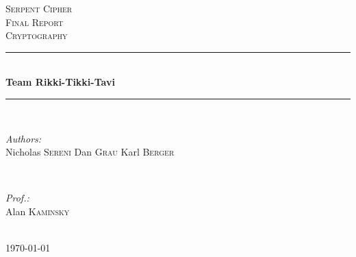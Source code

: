 \documentclass[12pt]{article} %
\begin{document}

\begin{titlepage}

\newcommand{\HRule}{\rule{\linewidth}{0.5mm}} %

\center %

\textsc{\LARGE Serpent Cipher}\\[1.5cm] %
\textsc{\Large Final Report}\\[0.5cm] %
\textsc{\large Cryptography}\\[0.5cm] %

\HRule \\[0.4cm]
{ \huge \bfseries Team Rikki-Tikki-Tavi}\\[0.4cm] %
\HRule \\[1.5cm]

\begin{minipage}{0.4\textwidth}
\begin{flushleft} \large
\emph{Authors:}\\
Nicholas \textsc{Sereni} %
\newline
Dan \textsc{Grau}
\newline
Karl \textsc{Berger}
\end{flushleft}
\end{minipage}
~
\begin{minipage}{0.4\textwidth}
\begin{flushright} \large
\emph{Prof.:} \\
Alan \textsc{Kaminsky} %
\end{flushright}
\end{minipage}\\[4cm]

{\large \today}\\[3cm] %


\vfill %

\end{titlepage}
\end{document}
